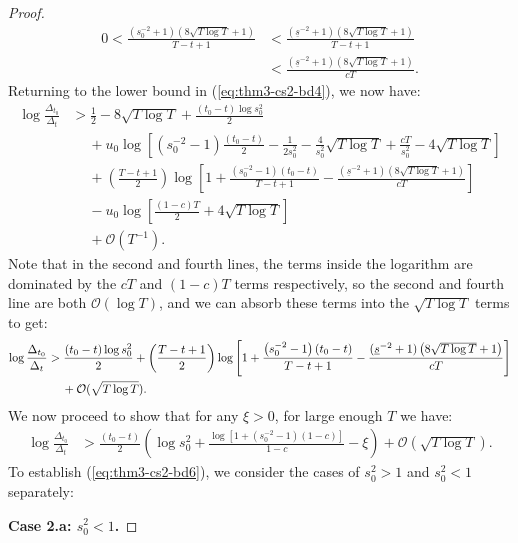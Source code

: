 \begin{proof}
\begin{align*}
     0 < \frac{\left(s_0^{-2} + 1\right)\left(8\sqrt{T\log T} +1\right)}{T - t + 1} &<  \frac{(\underline{s}^{-2} + 1)\left(8\sqrt{T\log T} +1\right)}{T - t + 1} \\
     &< \frac{(\underline{s}^{-2} + 1)\left(8\sqrt{T\log T} +1\right)}{cT}. \tag{$T-t+1 > cT$}  
\end{align*}
Returning to the lower bound in (\ref{eq:thm3-cs2-bd4}), we now have:
\begin{align*}
    \log \frac{\Delta_{t_0}}{\Delta_t} &> \frac{1}{2}-8\sqrt{T \log T} + \frac{(t_0 - t)\log s_0^2}{2} \\
    &\quad\: + u_0 \log\left[ (s_0^{-2}-1)\frac{(t_0 - t)}{2} -\frac{1}{2s_0^2} - \frac{4}{s_0^2} \sqrt{T\log T} + \frac{cT}{s_0^2} - 4 \sqrt{T \log T}\right] \\
    &\quad\: + \left(\frac{T - t + 1}{2}\right)\log\left[1 + \frac{\left(s_0^{-2} -1\right)(t_0 - t)}{T - t + 1} -  \frac{(\underline{s}^{-2} + 1)\left(8\sqrt{T\log T} +1\right)}{cT}\right]  \\
    &\quad\: - u_0\log\left[\frac{(1-c)T}{2} + 4\sqrt{T\log T}\right] \\
    &\quad\: +  \mathcal{O}(T^{-1}). 
\end{align*}
Note that in the second and fourth lines, the terms inside the logarithm are dominated by the $cT$ and $(1-c)T$ terms respectively, so the second and fourth line are both $\mathcal{O}(\log T)$, and we can absorb these terms into the $\sqrt{T \log T}$ terms to get: 
\begin{align}
    \log \frac{\Delta_{t_0}}{\Delta_t} &> \frac{(t_0 - t)\log s_0^2}{2} + \left(\frac{T - t + 1}{2}\right)\log\left[1 + \frac{\left(s_0^{-2} -1\right)(t_0 - t)}{T - t + 1} -  \frac{(\underline{s}^{-2} + 1)\left(8\sqrt{T\log T} +1\right)}{cT}\right] \notag \\
    &\quad\: + \mathcal{O}(\sqrt{T \log T}). \label{eq:thm3-cs2-bd5} 
\end{align}
We now proceed to show that for any $\xi > 0$, for large enough $T$ we have:
\begin{align}
    \log \frac{\Delta_{t_0}}{\Delta_t} &> \frac{(t_0 - t)}{2} \left(\log s_0^2 + \frac{\log[1 +  (s_0^{-2} -1)(1-c)]}{1-c} - \xi\right)  + \mathcal{O}(\sqrt{T \log T}). \label{eq:thm3-cs2-bd6} 
\end{align}
To establish (\ref{eq:thm3-cs2-bd6}), we consider the cases of $s_0^2 > 1$ and $s_0^2 < 1$ separately:

\textbf{Case 2.a: $s_0^2 < 1$.}


\end{proof}
